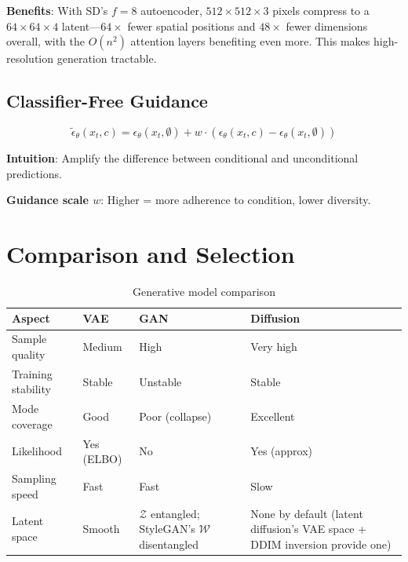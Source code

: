 \textbf{Benefits}: With SD's $f{=}8$ autoencoder, $512 \times 512 \times 3$ pixels compress to a $64 \times 64 \times 4$ latent---$64\times$ fewer spatial positions and $48\times$ fewer dimensions overall, with the $O(n^2)$ attention layers benefiting even more. This makes high-resolution generation tractable.

\subsection{Classifier-Free Guidance}

\begin{equation}
\tilde{\epsilon}_\theta(x_t, c) = \epsilon_\theta(x_t, \emptyset) + w \cdot (\epsilon_\theta(x_t, c) - \epsilon_\theta(x_t, \emptyset))
\end{equation}

\textbf{Intuition}: Amplify the difference between conditional and unconditional predictions.

\textbf{Guidance scale $w$}: Higher = more adherence to condition, lower diversity.

\section{Comparison and Selection}
\label{sec:gen_comparison}

\begin{table}[H]
\centering
\caption{Generative model comparison}
\begin{tabularx}{\textwidth}{lXXX}
\toprule
\textbf{Aspect} & \textbf{VAE} & \textbf{GAN} & \textbf{Diffusion} \\
\midrule
Sample quality & Medium & High & Very high \\
Training stability & Stable & Unstable & Stable \\
Mode coverage & Good & Poor (collapse) & Excellent \\
Likelihood & Yes (ELBO) & No & Yes (approx) \\
Sampling speed & Fast & Fast & Slow \\
Latent space & Smooth & $\mathcal{Z}$ entangled; StyleGAN's $\mathcal{W}$ disentangled & None by default (latent diffusion's VAE space + DDIM inversion provide one) \\
\bottomrule
\end{tabularx}
\end{table}


